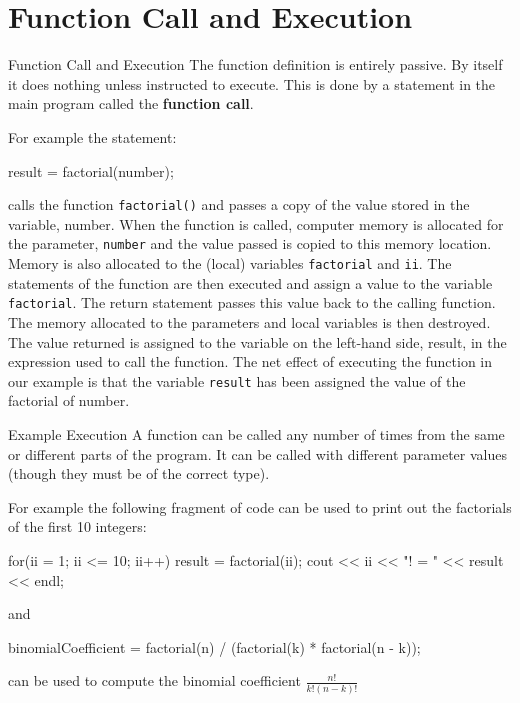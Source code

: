 \documentclass[../lecture4-functions.tex]{subfiles}
\begin{document}
\section{Function Call and Execution}


\begin{frame}[fragile]{Function Call and Execution}
    The function definition is entirely passive. By itself it does nothing unless instructed to execute. This is done by a statement in the main program called the \textbf{function call}. \newline

    For example the statement:
    \begin{cppcode}[lastline = 1, fontsize=\footnotesize]
result = factorial(number);
    \end{cppcode}

    calls the function \texttt{factorial()} and passes a copy of the value stored in the variable, number. When the function is called, computer memory is allocated for the parameter, \verb|number| and the value passed is copied to this memory location. Memory is also allocated to the (local) variables \verb|factorial| and \verb|ii|. The statements of the function are then executed and assign a value to the variable \verb|factorial|. The return statement passes this value back to the calling function. The memory allocated to the parameters and local variables is then destroyed. The value returned is assigned to the variable on the left-hand side, result, in the expression used to call the function. The net effect of executing the function in our example is that the variable \verb|result| has been assigned the value of the factorial of number.
\end{frame}


\begin{frame}[fragile]{Example Execution}
    A function can be called any number of times from the same or different parts of the program. It can be called with different parameter values (though they must be of the correct type). \newline

    For example the following fragment of code can be used to print out the factorials of the first 10 integers: \newline

    \begin{cppcode}[lastline = 5]
for(ii = 1; ii <= 10; ii++)
{
    result = factorial(ii);
    cout << ii << "! = " << result << endl;
}
    \end{cppcode}
    and
    \begin{cppcode}[lastline = 1]
binomialCoefficient = factorial(n) / (factorial(k) * factorial(n - k));
    \end{cppcode}

    can be used to compute the binomial coefficient \( \frac{n!}{k!(n - k)!} \)
\end{frame}
\end{document}
